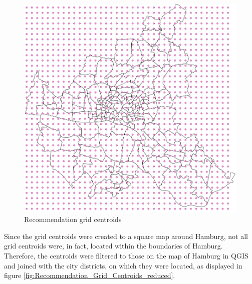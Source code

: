 \documentclass[a4paper, 11pt, oneside]{Thesis}  %
\begin{document}
\begin{figure}[h]
\includegraphics[scale=0.7]{Figures/Recommendation_map/Recommendation_Grid_Centroids.png}
\centering
\caption{Recommendation grid centroids}
\label{fig:Recommendation_Grid_Centroids}
\end{figure}

Since the grid centroids were created to a square map around Hamburg, not all grid centroids were, in fact, located within the boundaries of Hamburg. Therefore, the centroids were filtered to those on the map of Hamburg in QGIS and joined with the city districts, on which they were located, as displayed in figure \ref{fig:Recommendation_Grid_Centroids_reduced}.
\end{document}
